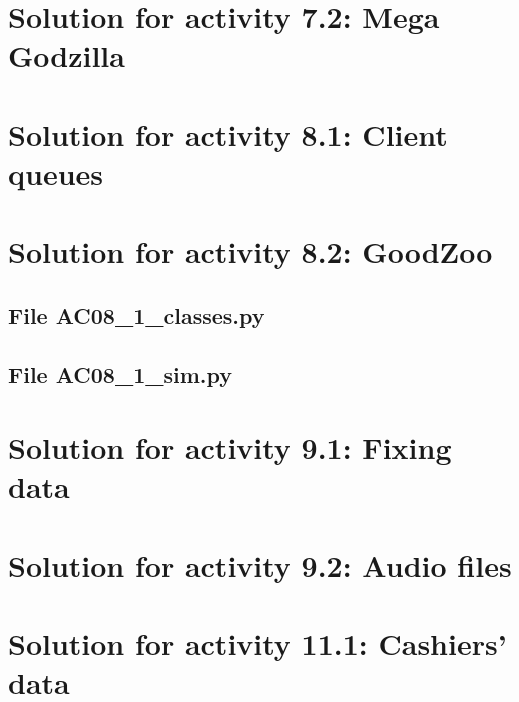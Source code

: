 \section{Solution for activity  7.2: Mega Godzilla}



\newpage
\section{Solution for activity  8.1: Client queues}

\newpage
\section{Solution for activity  8.2: GoodZoo}
\subsection{File AC08\_1\_classes.py}

\newpage
\subsection{File AC08\_1\_sim.py}



\newpage
\section{Solution for activity  9.1: Fixing data}

\newpage
\section{Solution for activity  9.2: Audio files}



\newpage
\section{Solution for activity  11.1: Cashiers' data}
















